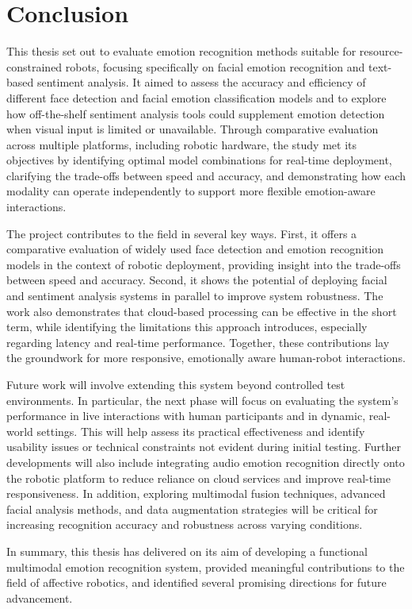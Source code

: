 \chapter{Conclusion}
This thesis set out to evaluate emotion recognition methods suitable for resource-constrained robots, focusing specifically on facial emotion recognition and text-based sentiment analysis. It aimed to assess the accuracy and efficiency of different face detection and facial emotion classification models and to explore how off-the-shelf sentiment analysis tools could supplement emotion detection when visual input is limited or unavailable. Through comparative evaluation across multiple platforms, including robotic hardware, the study met its objectives by identifying optimal model combinations for real-time deployment, clarifying the trade-offs between speed and accuracy, and demonstrating how each modality can operate independently to support more flexible emotion-aware interactions.

The project contributes to the field in several key ways. First, it offers a comparative evaluation of widely used face detection and emotion recognition models in the context of robotic deployment, providing insight into the trade-offs between speed and accuracy. Second, it shows the potential of deploying facial and sentiment analysis systems in parallel to improve system robustness. The work also demonstrates that cloud-based processing can be effective in the short term, while identifying the limitations this approach introduces, especially regarding latency and real-time performance. Together, these contributions lay the groundwork for more responsive, emotionally aware human-robot interactions.

Future work will involve extending this system beyond controlled test environments. In particular, the next phase will focus on evaluating the system's performance in live interactions with human participants and in dynamic, real-world settings. This will help assess its practical effectiveness and identify usability issues or technical constraints not evident during initial testing. Further developments will also include integrating audio emotion recognition directly onto the robotic platform to reduce reliance on cloud services and improve real-time responsiveness. In addition, exploring multimodal fusion techniques, advanced facial analysis methods, and data augmentation strategies will be critical for increasing recognition accuracy and robustness across varying conditions.

In summary, this thesis has delivered on its aim of developing a functional multimodal emotion recognition system, provided meaningful contributions to the field of affective robotics, and identified several promising directions for future advancement.
